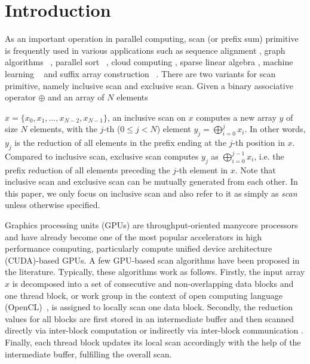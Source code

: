 \documentclass[article]{elsarticle}
\begin{document}
\section{Introduction}
As an important operation in parallel computing, scan (or prefix sum) primitive \cite{blelloch1989scans} is frequently used in various applications such as sequence alignment \cite{aluru2003parallel} \cite{khajeh2010acceleration}, graph algorithms \cite{vineet2009fast}~\cite{merrill2012scalable}, parallel sort \cite{cederman2009sorting}~\cite{satish2009designing}, cloud computing \cite{fang2011mars}, sparse linear algebra \cite{zhang2012novel}, machine learning \cite{kohlhoff2013k}~\cite{niu2014fast} and suffix array construction \cite{liuparallel}~\cite{patrick2015}. There are two variants for scan primitive, namely inclusive scan and exclusive scan. Given a binary associative operator $\oplus$ and an array of $N$ elements {$x=\{x_0, x_1, \ldots, x_{N-2}, x_{N-1}\}$, an inclusive scan on $x$ computes a new array $y$ of size $N$ elements, with the $j$-th (\mbox{$0\leq j < N$}) element \mbox{$y_j = \bigoplus_{i=0}^j x_i$}. In other words, $y_j$ is the reduction of all elements in the prefix ending at the $j$-th position in $x$. Compared to inclusive scan, exclusive scan computes $y_j$ as \mbox{$\bigoplus_{i=0}^{j-1}x_i$}, i.e. the prefix reduction of all elements preceding the $j$-th element in $x$. Note that inclusive scan and exclusive scan can be mutually generated from each other. In this paper, we only focus on inclusive scan and also refer to it as simply as \textit{scan} unless otherwise specified. 

Graphics processing units (GPUs) are throughput-oriented manycore processors and have already become one of the most popular accelerators in high performance computing, particularly compute unified device architecture (CUDA)-based GPUs. A few GPU-based scan algorithms \cite{sengupta2007scan} \cite{harris2007parallel} \cite{dotsenko2008fast} \cite{wei2012optimization} \cite{yan2013streamscan} have been proposed in the literature. Typically, these algorithms work as follows. Firstly, the input array $x$ is decomposed into a set of consecutive and non-overlapping data blocks and one thread block, or work group in the context of open computing language (OpenCL)~\cite{stone2010opencl}, is assigned to locally scan one data block. Secondly, the reduction values for all blocks are first stored in an intermediate buffer and then scanned directly via inter-block computation \cite{harris2007parallel} \cite{dotsenko2008fast} or indirectly via inter-block communication \cite{yan2013streamscan}. Finally, each thread block updates its local scan accordingly with the help of the intermediate buffer, fulfilling the overall scan.

}
\end{document}
